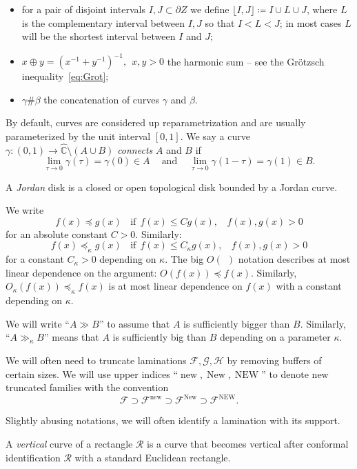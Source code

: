 \documentclass{amsart}
\renewcommand{\sp}{{\ \ }}
\newcommand{\1}{{\mathbb 1 }}
\newcommand{\FamG}{{\mathcal G}}
\newcommand{\FamH}{{\mathcal H}}
\newcommand{\Fam}{{\mathcal F}}
\newcommand\RR{\mathcal{R}}
\newcommand\new{{\operatorname{new}}}
\newcommand\New{{\operatorname{New}}}
\newcommand\NEW{{\operatorname{NEW}}}
\newcommand{\wC}{\widehat{\mathbb{C}}}
\theoremstyle{remark}
\numberwithin{equation}{section}
\theoremstyle{definition}
\begin{document}
\begin{itemize}
\item for a pair of disjoint intervals $I,J\subset \partial Z$ we define $\lfloor I, J \rfloor\coloneqq I\cup L\cup J$, where $L$ is the complementary interval between $I,J$ so that $I<L <J$; in most cases $L$ will be the shortest interval between $I$ and $J$;



 \item  $x\oplus y =(x^{-1}+y^{-1})^{-1},\sp x,y>0$ the harmonic sum -- see the Gr\"otzsch inequality~\eqref{eq:Grot};

 \item $\gamma \#\beta $ the concatenation of curves $\gamma$ and $\beta$.
 \end{itemize}
 By default, curves are considered up reparametrization and are usually parameterized by the unit interval $[0,1]$. We say a curve $\gamma\colon (0,1)\to \wC\setminus (A\cup B)$ \emph{connects} $A$ and $B$ if \[\lim_{\tau\to 0}\gamma(\tau)=\gamma(0)\in A\sp\sp\text{ and }\sp\sp \lim_{\tau\to 0}\gamma(1-\tau)=\gamma(1)\in B.\]

A \emph{Jordan} disk is a closed or open topological disk bounded by a Jordan curve.


We write \[f(x)\preceq g(x) \sp\sp \text {if}\sp  f(x)\le C g(x),\sp\sp f(x),g(x)>0\] 
for an absolute constant $C>0$. Similarly:
\[f(x)\preceq_\kappa g(x) \sp\sp \text {if}\sp  f(x)\le C_\kappa g(x),\sp\sp f(x),g(x)>0\] 
for a constant $C_\kappa>0$ depending on $\kappa$. The big $O(\sp )$ notation describes at most linear dependence on the argument: $O(f(x))\preceq f(x)$. Similarly, $O_\kappa(f(x))\preceq_\kappa f(x)$ is at most linear dependence on $f(x)$ with a constant depending on $\kappa$. 


We will write ``$A\gg B$'' to assume that $A$ is sufficiently bigger than $B$. Similarly, ``$A\gg_\kappa B$'' means that $A$ is sufficiently big than $B$ depending on a parameter $\kappa$.

We will often need to truncate laminations $\Fam,\FamG,\FamH$ by removing buffers of certain sizes. We will use upper indices  ``$\new,\New,\NEW$'' to denote new truncated families with the convention
\[\Fam \supset \Fam^\new \supset \Fam^\New \supset \Fam^\NEW.\]

Slightly abusing notations, we will often identify a lamination with its support.

A \emph{vertical} curve of a rectangle $\RR$ is a curve that becomes vertical after conformal identification $\RR$ with a standard Euclidean rectangle.
\end{document}
